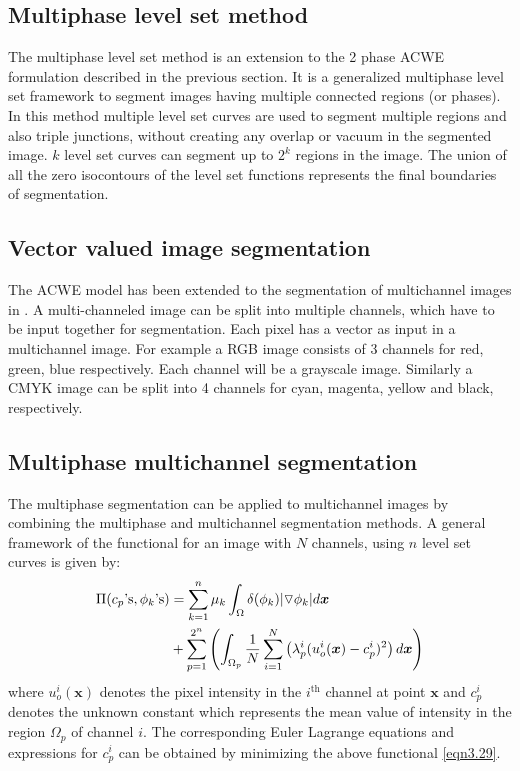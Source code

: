 \documentclass[10pt,letterpaper, onecolumn]{article}
\begin{document}
\subsection{Multiphase level set method}

The multiphase level set method \cite{vese2002multiphase} is an extension to the 2 phase ACWE formulation described in the previous section. It is a generalized multiphase level set framework to segment images having multiple connected regions (or phases). In this method multiple level set curves are used to segment multiple regions and also triple junctions, without creating any overlap or vacuum in the segmented image. $k$ level set curves can segment up to $2^k$ regions in the image. The union of all the zero isocontours of the level set functions represents the final boundaries of segmentation. 

\subsection{Vector valued image segmentation}
The ACWE model has been extended to the segmentation of multichannel images in
\cite{chan2000active}. A multi-channeled image can be split into multiple channels, which have to be input together for segmentation. Each pixel has a vector as input in a multichannel image. For example a RGB image consists of 3 channels for red, green, blue respectively. Each channel will be a grayscale image. Similarly a CMYK image can be split into 4 channels for cyan, magenta, yellow and black, respectively.

\subsection{Multiphase multichannel segmentation}

The multiphase segmentation can be applied to multichannel images by combining the multiphase and multichannel segmentation methods. A general framework of the functional for an image with $N$ channels, using $n$ level set curves is given by:
%
%
\begin{align}
\Pi (c_p \text{'s}, \phi_k \text{'s}) &= \sum_{k=1}^n \mu_k
\int_{\Omega} \delta (\phi_k) \vert \triangledown \phi_k \vert d\bm{x} \notag \\
&+ \sum_{p=1}^{2^n} \left(   \int_{\Omega_p} \frac{1}{N}
\sum_{i=1}^N \left(\lambda_p^i
(u_o^i(\bm{x}) - c_p^i)^2 \right) d\bm{x}  \right)
\label{eqn3.29}
\end{align}
%
%
where $u_o^i(\bm{x})$ denotes the pixel intensity in the 
$i^{\text{th}}$ channel at point $\bm{x}$ and $c_p^i$
denotes the unknown constant which represents the mean value of intensity in the region $\Omega_p$ of channel
$i$. The corresponding Euler Lagrange equations and expressions for $c_p^i$ can be obtained by minimizing the above functional \eqref{eqn3.29}.
\end{document}
